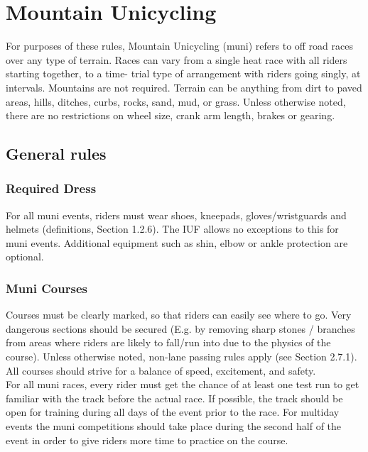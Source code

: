 \chapter{Mountain Unicycling}
\label{chap:muni}
For purposes of these rules, Mountain Unicycling (muni) refers to off road races
over any type of terrain. Races can vary from a single heat race with all riders
starting together, to a time- trial type of arrangement with riders going
singly, at intervals. Mountains are not required. Terrain can be anything from
dirt to paved areas, hills, ditches, curbs, rocks, sand, mud, or grass. Unless
otherwise noted, there are no restrictions on wheel size, crank arm length,
brakes or gearing.


\section{General rules}
\label{sec:muni-general}


\subsection{Required Dress}
\label{sec:muni-general}
For all muni events, riders must wear shoes, kneepads, gloves/wristguards and
helmets (definitions, Section 1.2.6). %
The IUF allows no exceptions to this for muni events. Additional equipment such
as shin, elbow or ankle protection are optional.


\subsection{Muni Courses}
\label{sec:muni-courses}
Courses must be clearly marked, so that riders can easily see where to go. Very
dangerous sections should be secured (E.g. by removing sharp stones / branches
from areas where riders are likely to fall/run into due to the physics of the
course). Unless otherwise noted, non-lane passing rules apply (see Section
2.7.1). %
All courses should strive for a balance of speed, excitement, and
safety.\\
For all muni races, every rider must get the chance of at least one test run to
get familiar with the track before the actual race. If possible, the track
should be open for training during all days of the event prior to the race. For
multiday events the muni competitions should take place during the second half
of the event in order to give riders more time to practice on the course.

